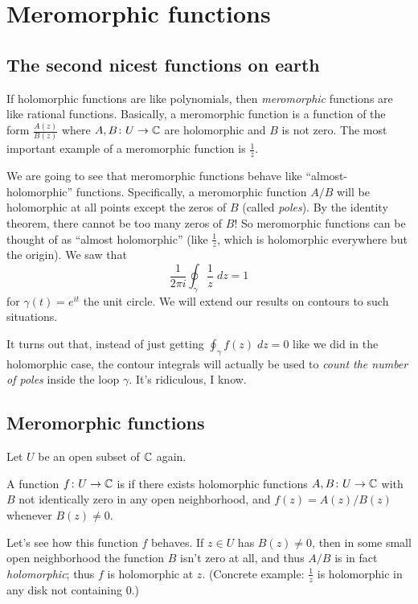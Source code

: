 \chapter{Meromorphic functions}
\label{ch:meromorphic_fn}
\section{The second nicest functions on earth}
If holomorphic functions are like polynomials,
then \emph{meromorphic} functions are like rational functions.
Basically, a meromorphic function is a function of the form
$ \frac{A(z)}{B(z)} $
where $A , B \colon  U \to \mathbb C$ are holomorphic and $B$ is not zero.
The most important example of a meromorphic function is $\frac 1z$.

We are going to see that meromorphic functions behave
like ``almost-holomorphic'' functions.
Specifically, a meromorphic function $A/B$ will be holomorphic at all points
except the zeros of $B$ (called \emph{poles}).
By the identity theorem, there cannot be too many zeros of $B$!
So meromorphic functions can be thought of as ``almost holomorphic''
(like $\frac 1z$, which is holomorphic everywhere but the origin).
We saw that
\[ \frac{1}{2\pi i} \oint_{\gamma} \frac 1z \; dz =  1 \]
for $\gamma(t) = e^{it}$ the unit circle.
We will extend our results on contours to such situations.

It turns out that, instead of just getting $\oint_\gamma f(z) \; dz = 0$
like we did in the holomorphic case,
the contour integrals will actually be used to
\emph{count the number of poles} inside the loop $\gamma$.
It's ridiculous, I know.

\section{Meromorphic functions}

Let $U$ be an open subset of $\mathbb C$ again.
\begin{definition}
	A function $f \colon U \to \mathbb C$ is 
	if there exists holomorphic functions $A, B \colon U \to \mathbb C$
	with $B$ not identically zero in any open neighborhood,
	and $f(z) = A(z)/B(z)$ whenever $B(z) \neq 0$.
\end{definition}
Let's see how this function $f$ behaves.
If $z \in U$ has $B(z) \neq 0$,
then in some small open neighborhood the function $B$ isn't zero
at all, and thus $A/B$ is in fact \emph{holomorphic};
thus $f$ is holomorphic at $z$.
(Concrete example: $\frac 1z$ is holomorphic
in any disk not containing $0$.)

